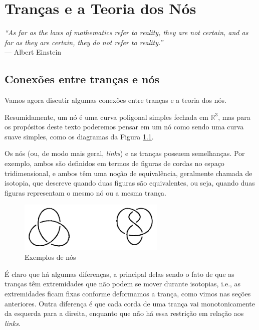 \chapter[Tranças e a Teoria dos Nós]{Tranças e a Teoria dos Nós}
\label{cap-5}
\chaptermark{}
%
\hfill%
\begin{minipage}{10cm}
\begin{flushright}
\rightskip=0.5cm
\textit{``As far as the laws of mathematics refer to reality, they are not certain, and as far as they are certain, they do not refer to reality.''}
\\[0.1cm]
\rightskip=0.5cm
--- Albert Einstein
\end{flushright}
\end{minipage}

\section{Conexões entre tranças e nós}

    Vamos agora discutir algumas conexões entre tranças e a teoria dos nós.
    
	\par\vspace{0.3cm} Resumidamente, um nó é uma curva poligonal simples fechada em $\mathbb{R}^3$, 
	mas para os propósitos deste texto poderemos pensar em um nó como sendo uma curva suave simples, 
	como os diagramas da Figura \ref{exemplos de nos}.
	
	\par\vspace{0.3cm} Os nós (ou, de modo mais geral, \textit{links}) e as tranças possuem semelhanças. 
	Por exemplo, ambos são definidos em termos de figuras de cordas no espaço tridimensional, e ambos 
	têm uma noção de equivalência, geralmente chamada de isotopia, que descreve quando duas figuras 
	são equivalentes, ou seja, quando duas figuras representam o mesmo nó ou a mesma trança.  
	\begin{figure}[H]
	\begin{center}
		\includegraphics[width=7cm]{Images/exemplos_de_no.png}
	\end{center}\caption{Exemplos de nós}
	\label{exemplos de nos}
	\end{figure}
	\par\vspace{0.3cm} É claro que há algumas diferenças, a principal delas sendo o fato de que 
	as tranças têm extremidades que não podem se mover durante isotopias, i.e., as extremidades 
	ficam fixas conforme deformamos a trança, como vimos nas seções anteriores. Outra diferença 
	é que cada corda de uma trança vai monotonicamente da esquerda para a direita, enquanto que 
	não há essa restrição em relação aos \textit{links}.
	
